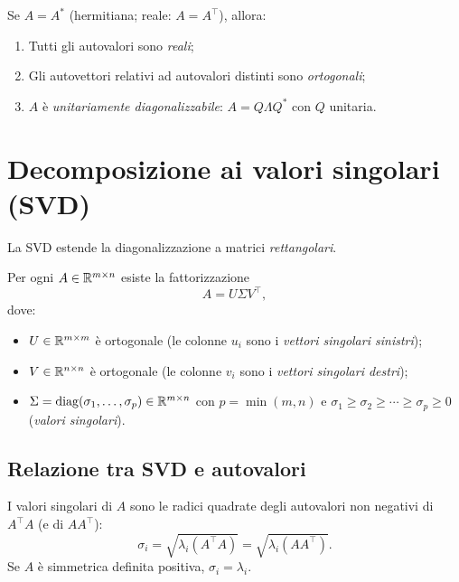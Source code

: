 \begin{theorem}
Se $A = A^*$ (hermitiana; reale: $A = A^\top$), allora:
\begin{enumerate}
  \item Tutti gli autovalori sono \emph{reali};
  \item Gli autovettori relativi ad autovalori distinti sono \emph{ortogonali};
  \item $A$ è \emph{unitariamente diagonalizzabile}: $A = Q\Lambda Q^*$ con $Q$
        unitaria.
\end{enumerate}
\end{theorem}

\section{Decomposizione ai valori singolari (SVD)}
\label{sec:svd}

La SVD estende la diagonalizzazione a matrici \emph{rettangolari}.

\begin{theorem}
\label{thm:svd}
Per ogni $A \in \mathbb{R}^{m \times n}$ esiste la fattorizzazione
\begin{equation}
  A = U \Sigma V^\top,
  \label{eq:svd}
\end{equation}
dove:
\begin{itemize}
  \item $U \in \mathbb{R}^{m \times m}$ è ortogonale (le colonne $u_i$ sono i
        \emph{vettori singolari sinistri});
  \item $V \in \mathbb{R}^{n \times n}$ è ortogonale (le colonne $v_i$ sono i
        \emph{vettori singolari destri});
  \item $\Sigma = \operatorname{diag}(\sigma_1, \ldots, \sigma_p) \in \mathbb{R}^{m \times n}$
        con $p = \min(m,n)$ e $\sigma_1 \geq \sigma_2 \geq \cdots \geq \sigma_p \geq 0$
        (\emph{valori singolari}).
\end{itemize}
\end{theorem}

\subsection{Relazione tra SVD e autovalori}

I valori singolari di $A$ sono le radici quadrate degli autovalori non negativi
di $A^\top A$ (e di $AA^\top$):
\begin{equation}
  \sigma_i = \sqrt{\lambda_i(A^\top A)} = \sqrt{\lambda_i(AA^\top)}.
  \label{eq:svd_autoval}
\end{equation}
Se $A$ è simmetrica definita positiva, $\sigma_i = \lambda_i$.

